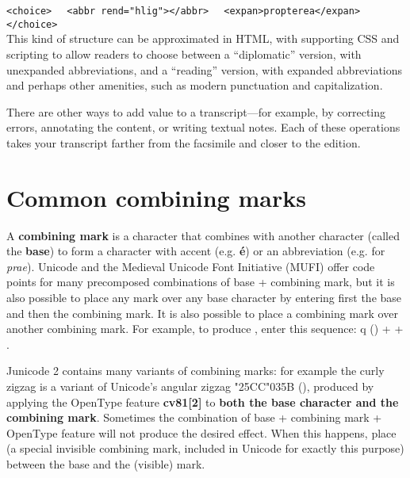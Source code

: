 \noindent\verb!<choice>!\newline
\verb!  <abbr rend="hlig">!\textrm{}\verb!</abbr>!\newline
\verb!  <expan>propterea</expan>!\newline
\verb!</choice>!\\[1ex]

\noindent This kind of structure can be approximated in HTML, with supporting CSS and scripting to allow readers to choose between
a ``diplomatic'' version, with unexpanded abbreviations, and a ``reading'' version, with expanded abbreviations and
perhaps other amenities, such as modern punctuation and capitalization.

There are other ways to add value to a transcript---for example, by correcting errors, annotating the content, or
writing textual notes. Each of these operations takes your transcript farther from the facsimile and closer to the
edition.

\section[Common combining marks]{Common combining marks}
A \textbf{combining mark} is a character that combines with another character (called the \textbf{base}) to form a
character with accent (e.g. \textbf{\'e}) or an abbreviation (e.g. \textbf{} for \textit{prae}).
Unicode and the Medieval Unicode Font Initiative (MUFI) offer code points for many precomposed combinations of base +
combining mark, but it is also possible to place any mark over any base character by entering first the base and then
the combining mark. It is also possible to place a combining mark over another combining mark. For example, to produce
\textbf{}, enter this sequence: q () +  + .

Junicode 2 contains many variants of combining marks: for example the curly zigzag  is a variant of
Unicode's angular zigzag {\char"25CC\char"035B} (), produced by applying the OpenType feature \textbf{cv81[2]} to \textbf{both the base character and the combining mark}. Sometimes the combination of base + combining mark + OpenType
feature will not produce the desired effect. When this happens, place  (a special invisible combining mark,
included in Unicode for exactly this purpose) between the base and the (visible) mark.\\

